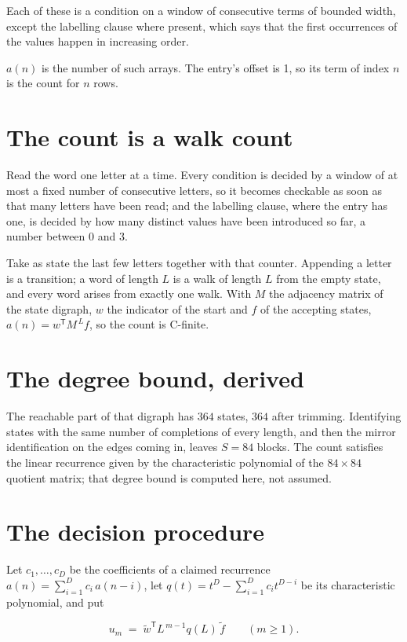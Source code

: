 \documentclass[11pt]{article}
\theoremstyle{definition}
\begin{document}
Each of these is a condition on a window of consecutive terms of bounded width, except the labelling clause where present, which says that the first occurrences of the values happen in increasing order.

$a(n)$ is the number of such arrays. The entry's offset is 1, so its term of index $n$ is the count for $n$ rows.

\section{The count is a walk count}

Read the word one letter at a time. Every condition is decided by a window of at most a fixed number of consecutive letters, so it becomes checkable as soon as that many letters have been read; and the labelling clause, where the entry has one, is decided by how many distinct values have been introduced so far, a number between $0$ and 3.

Take as state the last few letters together with that counter. Appending a letter is a transition; a word of length $L$ is a walk of length $L$ from the empty state, and every word arises from exactly one walk. With $M$ the adjacency matrix of the state digraph, $w$ the indicator of the start and $f$ of the accepting states, $a(n) = w^{\mathsf T}M^{\,L}f$, so the count is C-finite.

\section{The degree bound, derived}

The reachable part of that digraph has $364$ states, $364$ after trimming. Identifying states with the same number of completions of every length, and then the mirror identification on the edges coming in, leaves $S = 84$ blocks. The count satisfies the linear recurrence given by the characteristic polynomial of the $84\times84$ quotient matrix; that degree bound is computed here, not assumed.

\section{The decision procedure}

Let $c_1,\dots,c_D$ be the coefficients of a claimed recurrence $a(n) = \sum_{i=1}^{D} c_i\,a(n-i)$, let $q(t) = t^{D} - \sum_{i=1}^{D} c_i t^{D-i}$ be its characteristic polynomial, and put

\[u_m \;=\; \tilde w^{\mathsf T} L^{\,m-1} q(L)\,\tilde f \qquad (m \ge 1).\]
\end{document}
